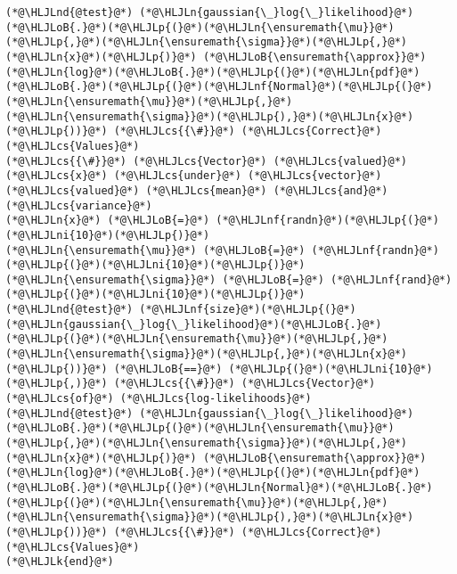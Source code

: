 \documentclass[12pt,a4paper]{article}
\newcommand{\HLJLk}[1]{\textcolor[RGB]{148,91,176}{\textbf{#1}}}
\newcommand{\HLJLn}[1]{#1}
\newcommand{\HLJLnd}[1]{\textcolor[RGB]{214,102,97}{#1}}
\newcommand{\HLJLnf}[1]{\textcolor[RGB]{66,102,213}{#1}}
\newcommand{\HLJLni}[1]{\textcolor[RGB]{59,151,46}{#1}}
\newcommand{\HLJLoB}[1]{\textcolor[RGB]{102,102,102}{\textbf{#1}}}
\newcommand{\HLJLp}[1]{#1}
\newcommand{\HLJLcs}[1]{\textcolor[RGB]{153,153,119}{\textit{#1}}}
\begin{document}
\begin{lstlisting}
(*@\HLJLnd{@test}@*) (*@\HLJLn{gaussian{\_}log{\_}likelihood}@*)(*@\HLJLoB{.}@*)(*@\HLJLp{(}@*)(*@\HLJLn{\ensuremath{\mu}}@*)(*@\HLJLp{,}@*)(*@\HLJLn{\ensuremath{\sigma}}@*)(*@\HLJLp{,}@*)(*@\HLJLn{x}@*)(*@\HLJLp{)}@*) (*@\HLJLoB{\ensuremath{\approx}}@*) (*@\HLJLn{log}@*)(*@\HLJLoB{.}@*)(*@\HLJLp{(}@*)(*@\HLJLn{pdf}@*)(*@\HLJLoB{.}@*)(*@\HLJLp{(}@*)(*@\HLJLnf{Normal}@*)(*@\HLJLp{(}@*)(*@\HLJLn{\ensuremath{\mu}}@*)(*@\HLJLp{,}@*)(*@\HLJLn{\ensuremath{\sigma}}@*)(*@\HLJLp{),}@*)(*@\HLJLn{x}@*)(*@\HLJLp{))}@*) (*@\HLJLcs{{\#}}@*) (*@\HLJLcs{Correct}@*) (*@\HLJLcs{Values}@*)
(*@\HLJLcs{{\#}}@*) (*@\HLJLcs{Vector}@*) (*@\HLJLcs{valued}@*) (*@\HLJLcs{x}@*) (*@\HLJLcs{under}@*) (*@\HLJLcs{vector}@*) (*@\HLJLcs{valued}@*) (*@\HLJLcs{mean}@*) (*@\HLJLcs{and}@*) (*@\HLJLcs{variance}@*)
(*@\HLJLn{x}@*) (*@\HLJLoB{=}@*) (*@\HLJLnf{randn}@*)(*@\HLJLp{(}@*)(*@\HLJLni{10}@*)(*@\HLJLp{)}@*)
(*@\HLJLn{\ensuremath{\mu}}@*) (*@\HLJLoB{=}@*) (*@\HLJLnf{randn}@*)(*@\HLJLp{(}@*)(*@\HLJLni{10}@*)(*@\HLJLp{)}@*)
(*@\HLJLn{\ensuremath{\sigma}}@*) (*@\HLJLoB{=}@*) (*@\HLJLnf{rand}@*)(*@\HLJLp{(}@*)(*@\HLJLni{10}@*)(*@\HLJLp{)}@*)
(*@\HLJLnd{@test}@*) (*@\HLJLnf{size}@*)(*@\HLJLp{(}@*)(*@\HLJLn{gaussian{\_}log{\_}likelihood}@*)(*@\HLJLoB{.}@*)(*@\HLJLp{(}@*)(*@\HLJLn{\ensuremath{\mu}}@*)(*@\HLJLp{,}@*)(*@\HLJLn{\ensuremath{\sigma}}@*)(*@\HLJLp{,}@*)(*@\HLJLn{x}@*)(*@\HLJLp{))}@*) (*@\HLJLoB{==}@*) (*@\HLJLp{(}@*)(*@\HLJLni{10}@*)(*@\HLJLp{,)}@*) (*@\HLJLcs{{\#}}@*) (*@\HLJLcs{Vector}@*) (*@\HLJLcs{of}@*) (*@\HLJLcs{log-likelihoods}@*)
(*@\HLJLnd{@test}@*) (*@\HLJLn{gaussian{\_}log{\_}likelihood}@*)(*@\HLJLoB{.}@*)(*@\HLJLp{(}@*)(*@\HLJLn{\ensuremath{\mu}}@*)(*@\HLJLp{,}@*)(*@\HLJLn{\ensuremath{\sigma}}@*)(*@\HLJLp{,}@*)(*@\HLJLn{x}@*)(*@\HLJLp{)}@*) (*@\HLJLoB{\ensuremath{\approx}}@*) (*@\HLJLn{log}@*)(*@\HLJLoB{.}@*)(*@\HLJLp{(}@*)(*@\HLJLn{pdf}@*)(*@\HLJLoB{.}@*)(*@\HLJLp{(}@*)(*@\HLJLn{Normal}@*)(*@\HLJLoB{.}@*)(*@\HLJLp{(}@*)(*@\HLJLn{\ensuremath{\mu}}@*)(*@\HLJLp{,}@*)(*@\HLJLn{\ensuremath{\sigma}}@*)(*@\HLJLp{),}@*)(*@\HLJLn{x}@*)(*@\HLJLp{))}@*) (*@\HLJLcs{{\#}}@*) (*@\HLJLcs{Correct}@*) (*@\HLJLcs{Values}@*)
(*@\HLJLk{end}@*)
\end{lstlisting}
\end{document}
